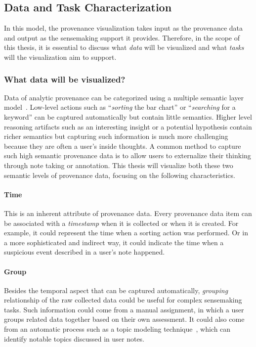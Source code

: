\subsection{Data and Task Characterization}
In this model, the provenance visualization takes input as the provenance data and output as the sensemaking support it provides. Therefore, in the scope of this thesis, it is essential to discuss what \emph{data} will be visualized and what \emph{tasks} will the visualization aim to support.

\subsubsection*{What data will be visualized?}
Data of analytic provenance can be categorized using a multiple semantic layer model~\cite{Gotz2009}. Low-level actions such as ``\emph{sorting} the bar chart'' or ``\emph{searching} for a keyword'' can be captured automatically but contain little semantics. Higher level reasoning artifacts such as an interesting insight or a potential hypothesis contain richer semantics but capturing such information is much more challenging because they are often a user's inside thoughts. A common method to capture such high semantic provenance data is to allow users to externalize their thinking through note taking or annotation. This thesis will visualize both these two semantic levels of provenance data, focusing on the following characteristics.
	
\paragraph{Time}
This is an inherent attribute of provenance data. Every provenance data item can be associated with a \emph{timestamp} when it is collected or when it is created. For example, it could represent the time when a sorting action was performed. Or in a more sophisticated and indirect way, it could indicate the time when a suspicious event described in a user's note happened.

\paragraph{Group}
Besides the temporal aspect that can be captured automatically, \emph{grouping} relationship of the raw collected data could be useful for complex sensemaking tasks. Such information could come from a manual assignment, in which a user groups related data together based on their own assessment. It could also come from an automatic process such as a topic modeling technique~\cite{Blei2003}, which can identify notable topics discussed in user notes. 
	
